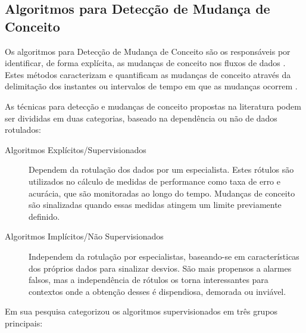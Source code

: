 \documentclass[qual, classic, a4paper]{ufbathesis}
\begin{document}
\subsection{Algoritmos para Detecção de Mudança de Conceito}

Os algoritmos para Detecção de Mudança de Conceito são os responsáveis por identificar, de forma explícita, as mudanças de conceito nos fluxos de dados \cite{Gama:2014:SCD:2597757.2523813}.
Estes métodos caracterizam e quantificam as mudanças de conceito através da delimitação dos instantes ou intervalos de tempo em que as mudanças ocorrem \cite{Basseville:1993:DAC:151741}.

As técnicas para detecção e mudanças de conceito propostas na literatura podem ser divididas em duas categorias, baseado na dependência ou não de dados rotulados:
\begin{description}
    \item[Algoritmos Explícitos/Supervisionados] Dependem da rotulação dos dados por um especialista.
    Estes rótulos são utilizados no cálculo de medidas de performance como taxa de erro e acurácia, que são monitoradas ao longo do tempo.
    Mudanças de conceito são sinalizadas quando essas medidas atingem um limite previamente definido.

    \item[Algoritmos Implícitos/Não Supervisionados] Independem da rotulação por especialistas, 
    baseando-se em características dos próprios dados para sinalizar desvios.
    São mais propensos a alarmes falsos, mas a independência de rótulos os torna interessantes para contextos onde a obtenção desses é dispendiosa, demorada ou inviável.
\end{description}

Em sua pesquisa \cite{Gama:2014:SCD:2597757.2523813} categorizou os algoritmos supervisionados em três grupos principais:
\end{document}
